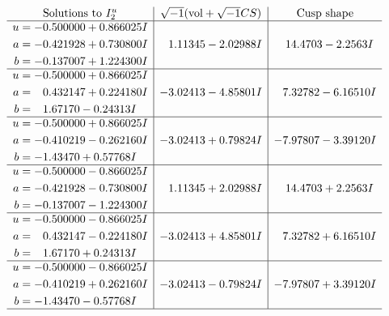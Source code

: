 \documentclass[1p]{elsarticle_modified}
\theoremstyle{definition}
\newcommand{\I}{\sqrt{-1}}
\begin{document}
$$\begin{array}{c|c|c}  
\text{Solutions to }I^u_{2}& \I (\text{vol} + \sqrt{-1}CS) & \text{Cusp shape}\\
 \hline 
\begin{aligned}
u &= -0.500000 + 0.866025 I \\
a &= -0.421928 + 0.730800 I \\
b &= -0.137007 + 1.224300 I\end{aligned}
 & \phantom{-}1.11345 - 2.02988 I & \phantom{-}14.4703 - 2.2563 I \\ \hline\begin{aligned}
u &= -0.500000 + 0.866025 I \\
a &= \phantom{-}0.432147 + 0.224180 I \\
b &= \phantom{-}1.67170 - 0.24313 I\end{aligned}
 & -3.02413 - 4.85801 I & \phantom{-}7.32782 - 6.16510 I \\ \hline\begin{aligned}
u &= -0.500000 + 0.866025 I \\
a &= -0.410219 - 0.262160 I \\
b &= -1.43470 + 0.57768 I\end{aligned}
 & -3.02413 + 0.79824 I & -7.97807 - 3.39120 I \\ \hline\begin{aligned}
u &= -0.500000 - 0.866025 I \\
a &= -0.421928 - 0.730800 I \\
b &= -0.137007 - 1.224300 I\end{aligned}
 & \phantom{-}1.11345 + 2.02988 I & \phantom{-}14.4703 + 2.2563 I \\ \hline\begin{aligned}
u &= -0.500000 - 0.866025 I \\
a &= \phantom{-}0.432147 - 0.224180 I \\
b &= \phantom{-}1.67170 + 0.24313 I\end{aligned}
 & -3.02413 + 4.85801 I & \phantom{-}7.32782 + 6.16510 I \\ \hline\begin{aligned}
u &= -0.500000 - 0.866025 I \\
a &= -0.410219 + 0.262160 I \\
b &= -1.43470 - 0.57768 I\end{aligned}
 & -3.02413 - 0.79824 I & -7.97807 + 3.39120 I\\
 \hline 
 \end{array}$$\newpage
\end{document}
